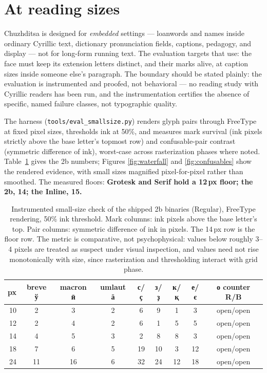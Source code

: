 \documentclass[11pt]{article}
\newcommand{\cz}[1]{{\chu #1}}
\begin{document}
\section{At reading sizes}

Chuzhditsa is designed for \emph{embedded} settings — loanwords and names inside ordinary Cyrillic text, dictionary pronunciation fields, captions, pedagogy, and display — not for long-form running text. The evaluation targets that use: the face must keep its extension letters distinct, and their marks alive, at caption sizes inside someone else's paragraph. The boundary should be stated plainly: the evaluation is instrumented and proofed, not behavioral — no reading study with Cyrillic readers has been run, and the instrumentation certifies the absence of specific, named failure classes, not typographic quality.

The harness (\texttt{tools/eval\_smallsize.py}) renders glyph pairs through FreeType at fixed pixel sizes, thresholds ink at 50\%, and measures mark survival (ink pixels strictly above the base letter's topmost row) and confusable-pair contrast (symmetric difference of ink), worst-case across rasterization phases where noted. Table~\ref{tab:sizes} gives the 2b numbers; Figures \ref{fig:waterfall} and \ref{fig:confusables} show the rendered evidence, with small sizes magnified pixel-for-pixel rather than smoothed. The measured floors: \textbf{Grotesk and Serif hold a 12\,px floor; the 2b, 14; the Inline, 15.}

\begin{table}[ht]\centering\small
\begin{tabular}{rcccccccc}
\toprule
px & breve \cz{ў} & macron \cz{ӣ} & umlaut \cz{ӓ} & \cz{с}/\cz{ҫ} & \cz{з}/\cz{ҙ} & \cz{к}/\cz{қ} & \cz{е}/\cz{є} & \cz{о} counter R/B \\
\midrule
10 & 2 & 3 & 2 & 6 & 9 & 1 & 3 & open/open \\
12 & 2 & 4 & 2 & 6 & 1 & 5 & 5 & open/open \\
14 & 4 & 5 & 3 & 2 & 8 & 8 & 3 & open/open \\
18 & 7 & 6 & 5 & 19 & 10 & 3 & 12 & open/open \\
24 & 11 & 16 & 6 & 32 & 24 & 12 & 18 & open/open \\
\bottomrule
\end{tabular}
\caption{Instrumented small-size check of the shipped 2b binaries (Regular), FreeType rendering, 50\% ink threshold. Mark columns: ink pixels above the base letter's top. Pair columns: symmetric difference of ink in pixels. The 14\,px row is the floor row. The metric is comparative, not psychophysical: values below roughly 3--4 pixels are treated as suspect under visual inspection, and values need not rise monotonically with size, since rasterization and thresholding interact with grid phase.}
\label{tab:sizes}
\end{table}
\end{document}
